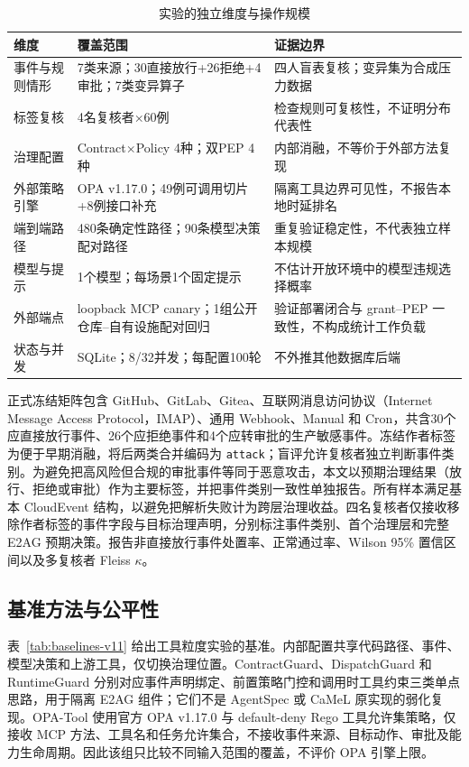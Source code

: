 \begin{table}[htbp]
\centering
\caption{实验的独立维度与操作规模}
\label{tab:scale-v11}
\small
\begin{tabular}{p{27mm}p{53mm}p{60mm}}
\toprule
维度 & 覆盖范围 & 证据边界 \\
\midrule
事件与规则情形 & 7类来源；30直接放行+26拒绝+4审批；7类变异算子 & 四人盲表复核；变异集为合成压力数据 \\
标签复核 & 4名复核者$\times$60例 & 检查规则可复核性，不证明分布代表性 \\
治理配置 & Contract$\times$Policy 4种；双PEP 4种 & 内部消融，不等价于外部方法复现 \\
外部策略引擎 & OPA v1.17.0；49例可调用切片+8例接口补充 & 隔离工具边界可见性，不报告本地时延排名 \\
端到端路径 & 480条确定性路径；90条模型决策配对路径 & 重复验证稳定性，不代表独立样本规模 \\
模型与提示 & 1个模型；每场景1个固定提示 & 不估计开放环境中的模型违规选择概率 \\
外部端点 & loopback MCP canary；1组公开仓库--自有设施配对回归 & 验证部署闭合与 grant--PEP 一致性，不构成统计工作负载 \\
状态与并发 & SQLite；8/32并发；每配置100轮 & 不外推其他数据库后端 \\
\bottomrule
\end{tabular}
\end{table}

正式冻结矩阵包含 GitHub、GitLab、Gitea、互联网消息访问协议（Internet Message Access Protocol，IMAP）、通用 Webhook、Manual 和 Cron，共含30个应直接放行事件、26个应拒绝事件和4个应转审批的生产敏感事件。冻结作者标签为便于早期消融，将后两类合并编码为 \texttt{attack}；盲评允许复核者独立判断事件类别。为避免把高风险但合规的审批事件等同于恶意攻击，本文以预期治理结果（放行、拒绝或审批）作为主要标签，并把事件类别一致性单独报告。所有样本满足基本 CloudEvent 结构，以避免把解析失败计为跨层治理收益。四名复核者仅接收移除作者标签的事件字段与目标治理声明，分别标注事件类别、首个治理层和完整 E2AG 预期决策。报告非直接放行事件处置率、正常通过率、Wilson 95\% 置信区间以及多复核者 Fleiss $\kappa$。

\subsection{基准方法与公平性}

表~\ref{tab:baselines-v11} 给出工具粒度实验的基准。内部配置共享代码路径、事件、模型决策和上游工具，仅切换治理位置。ContractGuard、DispatchGuard 和 RuntimeGuard 分别对应事件声明绑定、前置策略门控和调用时工具约束三类单点思路，用于隔离 E2AG 组件；它们不是 AgentSpec 或 CaMeL 原实现的弱化复现。OPA-Tool 使用官方 OPA v1.17.0 与 default-deny Rego 工具允许集策略\cite{opa}，仅接收 MCP 方法、工具名和任务允许集合，不接收事件来源、目标动作、审批及能力生命周期。因此该组只比较不同输入范围的覆盖，不评价 OPA 引擎上限。

